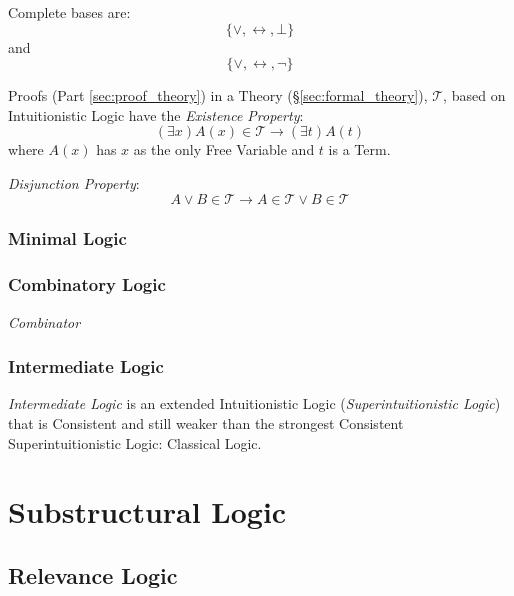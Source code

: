 Complete bases are:
\[
    \{ \vee, \leftrightarrow, \bot \}
\]
and
\[
    \{ \vee, \leftrightarrow, \neg \}
\]

Proofs (Part \ref{sec:proof_theory}) in a Theory
(\S\ref{sec:formal_theory}), $\mathcal{T}$, based on Intuitionistic
Logic have the \emph{Existence Property}:
\[
    (\exists x)A(x) \in \mathcal{T} \rightarrow (\exists t)A(t)
\]
where $A(x)$ has $x$ as the only Free Variable and $t$ is a Term.

\emph{Disjunction Property}:
\[
    A \vee B \in \mathcal{T} \rightarrow A \in \mathcal{T} \vee B \in \mathcal{T}
\]

\subsubsection{Minimal Logic}



\subsubsection{Combinatory Logic}\label{sec:combinatory_logic}

\emph{Combinator}



\subsubsection{Intermediate Logic}

\emph{Intermediate Logic} is an extended Intuitionistic Logic
(\emph{Superintuitionistic Logic}) that is Consistent and still weaker
than the strongest Consistent Superintuitionistic Logic: Classical
Logic.



\section{Substructural Logic}\label{sec:substructural_logic}

\subsection{Relevance Logic}\label{sec:relevance_logic}

